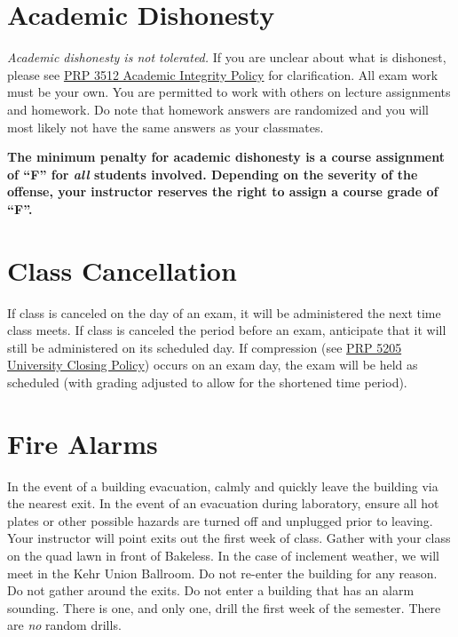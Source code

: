 \documentclass[11pt,letterpaper]{article}
\begin{document}
\section{Academic Dishonesty}
\emph{Academic dishonesty is not tolerated.} If you are unclear about what is
dishonest, please see 
\href{https://www.bloomu.edu/prp-3512-academic-integrity-policy}{PRP 3512
Academic Integrity Policy} for clarification. All exam work must be your own.
You are permitted to work with others on lecture assignments and homework. Do
note that homework answers are randomized and you will most likely not have the
same answers as your classmates.

\begin{mdframed}
	\centering\bfseries The minimum penalty for academic dishonesty is a
	course assignment of ``F'' for \emph{all} students involved. Depending
	on the severity of the offense, your
	instructor reserves the right to assign a course grade of ``F''.
\end{mdframed}

\section{Class Cancellation}
If class is canceled on the day of an exam, it will be administered the next
time class meets.  If class is canceled the period before an exam, anticipate
that it will still be administered on its scheduled day. If compression
(see \href{https://www.bloomu.edu/documents/prp5205}{PRP 5205 University Closing
Policy})
occurs on an exam day, the exam will be held as scheduled (with
grading adjusted to allow for the shortened time period).

\section{Fire Alarms}
In the event of a building evacuation, calmly and quickly leave the building via
the nearest exit. In the event of an evacuation during laboratory, ensure all
hot plates or other possible hazards are turned off and unplugged prior to
leaving. Your instructor will point exits out the first week of class.  Gather
with your class on the quad lawn in front of Bakeless. In the case of inclement
weather, we will meet in the Kehr Union Ballroom. Do not re-enter the
building for any reason. Do not gather around the exits. Do not enter a
building that has an alarm sounding. There is one, and only one, drill the first
week of the semester. There are \emph{no} random drills.
\end{document}

